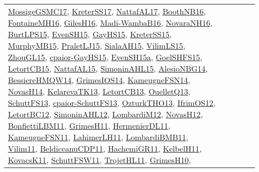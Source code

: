 {\begin{longtable}{lp{3cm}>{\raggedright}p{6cm}>{\raggedright}p{6cm}p{8cm}}
\href{papers/MossigeGSMC17.pdf}{MossigeGSMC17}\cite{MossigeGSMC17}, \href{articles/KreterSS17.pdf}{KreterSS17}\cite{KreterSS17}, \href{articles/NattafAL17.pdf}{NattafAL17}\cite{NattafAL17}, \href{papers/BoothNB16.pdf}{BoothNB16}\cite{BoothNB16}, \href{papers/FontaineMH16.pdf}{FontaineMH16}\cite{FontaineMH16}, \href{papers/GilesH16.pdf}{GilesH16}\cite{GilesH16}, \href{papers/Madi-WambaB16.pdf}{Madi-WambaB16}\cite{Madi-WambaB16}, \href{articles/NovaraNH16.pdf}{NovaraNH16}\cite{NovaraNH16}, \href{papers/BurtLPS15.pdf}{BurtLPS15}\cite{BurtLPS15}, \href{papers/EvenSH15.pdf}{EvenSH15}\cite{EvenSH15}, \href{papers/GayHS15.pdf}{GayHS15}\cite{GayHS15}, \href{papers/KreterSS15.pdf}{KreterSS15}\cite{KreterSS15}, \href{papers/MurphyMB15.pdf}{MurphyMB15}\cite{MurphyMB15}, \href{papers/PraletLJ15.pdf}{PraletLJ15}\cite{PraletLJ15}, \href{papers/SialaAH15.pdf}{SialaAH15}\cite{SialaAH15}, \href{papers/VilimLS15.pdf}{VilimLS15}\cite{VilimLS15}, \href{papers/ZhouGL15.pdf}{ZhouGL15}\cite{ZhouGL15}, \href{papers/cpaior-GayHS15.pdf}{cpaior-GayHS15}\cite{cpaior-GayHS15}, \href{articles/EvenSH15a.pdf}{EvenSH15a}\cite{EvenSH15a}, \href{articles/GoelSHFS15.pdf}{GoelSHFS15}\cite{GoelSHFS15}, \href{articles/LetortCB15.pdf}{LetortCB15}\cite{LetortCB15}, \href{articles/NattafAL15.pdf}{NattafAL15}\cite{NattafAL15}, \href{articles/SimoninAHL15.pdf}{SimoninAHL15}\cite{SimoninAHL15}, \href{papers/AlesioNBG14.pdf}{AlesioNBG14}\cite{AlesioNBG14}, \href{papers/BessiereHMQW14.pdf}{BessiereHMQW14}\cite{BessiereHMQW14}, \href{articles/GrimesIOS14.pdf}{GrimesIOS14}\cite{GrimesIOS14}, \href{articles/KameugneFSN14.pdf}{KameugneFSN14}\cite{KameugneFSN14}, \href{articles/NovasH14.pdf}{NovasH14}\cite{NovasH14}, \href{papers/KelarevaTK13.pdf}{KelarevaTK13}\cite{KelarevaTK13}, \href{papers/LetortCB13.pdf}{LetortCB13}\cite{LetortCB13}, \href{papers/OuelletQ13.pdf}{OuelletQ13}\cite{OuelletQ13}, \href{papers/SchuttFS13.pdf}{SchuttFS13}\cite{SchuttFS13}, \href{papers/cpaior-SchuttFS13.pdf}{cpaior-SchuttFS13}\cite{cpaior-SchuttFS13}, \href{articles/OzturkTHO13.pdf}{OzturkTHO13}\cite{OzturkTHO13}, \href{papers/IfrimOS12.pdf}{IfrimOS12}\cite{IfrimOS12}, \href{papers/LetortBC12.pdf}{LetortBC12}\cite{LetortBC12}, \href{papers/SimoninAHL12.pdf}{SimoninAHL12}\cite{SimoninAHL12}, \href{articles/LombardiM12.pdf}{LombardiM12}\cite{LombardiM12}, \href{articles/NovasH12.pdf}{NovasH12}\cite{NovasH12}, \href{papers/BonfiettiLBM11.pdf}{BonfiettiLBM11}\cite{BonfiettiLBM11}, \href{papers/GrimesH11.pdf}{GrimesH11}\cite{GrimesH11}, \href{papers/HermenierDL11.pdf}{HermenierDL11}\cite{HermenierDL11}, \href{papers/KameugneFSN11.pdf}{KameugneFSN11}\cite{KameugneFSN11}, \href{papers/LahimerLH11.pdf}{LahimerLH11}\cite{LahimerLH11}, \href{papers/LombardiBMB11.pdf}{LombardiBMB11}\cite{LombardiBMB11}, \href{papers/Vilim11.pdf}{Vilim11}\cite{Vilim11}, \href{articles/BeldiceanuCDP11.pdf}{BeldiceanuCDP11}\cite{BeldiceanuCDP11}, \href{articles/HachemiGR11.pdf}{HachemiGR11}\cite{HachemiGR11}, \href{articles/KelbelH11.pdf}{KelbelH11}\cite{KelbelH11}, \href{articles/KovacsK11.pdf}{KovacsK11}\cite{KovacsK11}, \href{articles/SchuttFSW11.pdf}{SchuttFSW11}\cite{SchuttFSW11}, \href{articles/TrojetHL11.pdf}{TrojetHL11}\cite{TrojetHL11}, \href{papers/GrimesH10.pdf}{GrimesH10}\cite{GrimesH10}, 
\end{longtable}}

